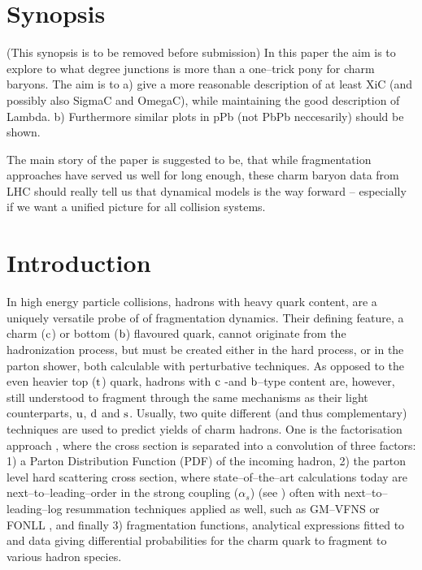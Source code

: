 \documentclass[main.tex]{subfiles}
\begin{document}
\section{Synopsis}
(This synopsis is to be removed before submission)
In this paper the aim is to explore to what degree junctions is more than a one--trick pony
for charm baryons. The aim is to a) give a more reasonable description of at least XiC (and possibly also SigmaC and OmegaC), while maintaining the good description of Lambda. b) Furthermore similar plots in pPb (not PbPb neccesarily) should be shown. 

The main story of the paper is suggested to be, that while fragmentation approaches have served us well for long enough, these charm baryon data from LHC should really tell us that dynamical models is the way forward -- especially if we want a unified picture for all collision systems.

\section{Introduction}
\label{sec:introduction}
In high energy particle collisions, hadrons with heavy quark content, are a uniquely versatile probe of of fragmentation dynamics. Their defining feature, a charm ($\mathrm{c}$) or bottom ($\mathrm{b}$) 
flavoured quark, cannot originate from the hadronization process, but must be created either in the hard process, or in the parton shower, both calculable with perturbative techniques. 
As opposed to the even heavier top ($\mathrm{t}$) quark, hadrons with $\mathrm{c}$ -and $\mathrm{b}$--type content are, however, still understood to fragment through the same mechanisms as their 
light counterparts, $\mathrm{u}$, $\mathrm{d}$ and $\mathrm{s}$. Usually, two quite different (and thus complementary) 
techniques are used to predict yields of charm hadrons. One is the factorisation approach \cite{Collins:1985gm,Collins:1989gx}, where the cross section is separated into a convolution of three factors: 1) a Parton Distribution 
Function (PDF) of the incoming hadron, 2) the parton level hard scattering cross section, where state--of--the--art calculations today are next--to--leading--order in the strong coupling 
($\alpha_s$) (see \eg \cite{Nason:1987xz,Nason:1989zy,Mangano:1991jk}) often with next--to--leading--log resummation techniques applied as well, such as \eg GM--VFNS \cite{Helenius:2018uul} or FONLL \cite{Cacciari:1998it,Cacciari:2012ny}, and finally 3) fragmentation functions, analytical expressions fitted to 
\epem and \ep data \cite{} giving differential probabilities for the charm quark to fragment to various hadron species. 
\end{document}
